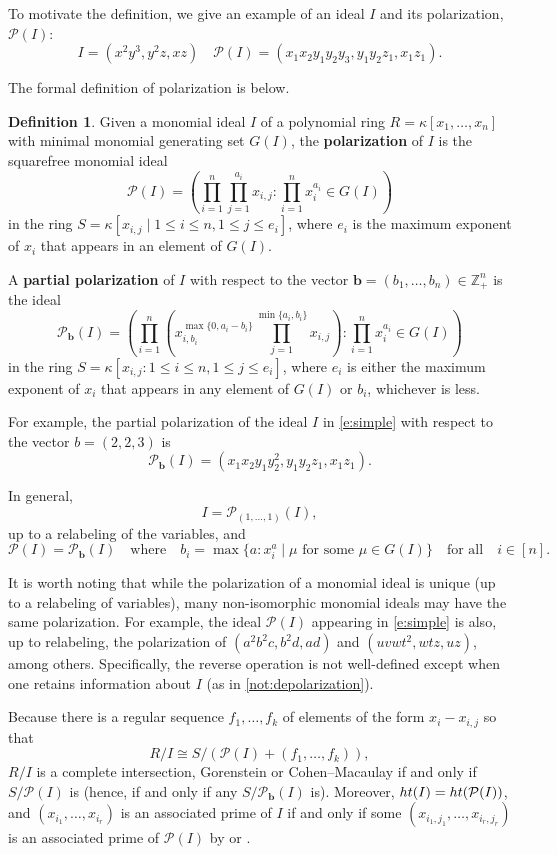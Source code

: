 \documentclass[12pt, reqno]{amsart}
\numberwithin{equation}{section}
\newtheorem{Main Conjecture}[theorem]{Main Conjecture}
\theoremstyle{definition}
\newtheorem{defn}[theorem]{Definition}
\theoremstyle{plain}
\newcommand{\hgt}{{\rm{ht }}}
\newcommand{\ZZ}{\mathbb{Z}}
\renewcommand{\P}{\mathcal{P}}
\newcommand{\bb}{\mathbf{b}}
\newcommand{\qforall}{\quad \mbox{for all} \quad}
\newcommand{\qwhere}{\quad \mbox{where} \quad}
\begin{document}
To motivate the definition, we give an example of an ideal $I$ and its polarization, $\P(I)$: 
\begin{equation}\label{e:simple}
I=(x^2y^3,y^2z,xz) \quad \P(I)=(x_1x_2y_1y_2y_3,y_1y_2z_1,x_1z_1).
\end{equation}

The formal definition of polarization is below.

 \begin{defn}
 \label{def:polarization}
 Given a monomial ideal $I$ of a polynomial ring $R=\kappa[x_1,\ldots, x_n]$ with minimal monomial generating set $G(I)$,
 the {\bf polarization} of $I$ is the squarefree monomial ideal  
 \[
 \P(I)=\left (\prod_{i=1}^n\prod_{j=1}^{a_i}x_{i,j} \colon \prod_{i=1}^n x_i^{a_i}\in G(I)\right)
 \]
 in the ring $S=\kappa[x_{i,j}\mid 1\leq i\leq n, 1\leq j\leq e_i]$, where $e_i$ is the maximum exponent of $x_i$ that appears in an element of $G(I)$.  
 
 A {\bf partial polarization} of $I$ with respect to the vector $\bb=(b_1,\ldots,b_n) \in \ZZ_+^n$ is the ideal  
 \[
 \P_{\bb}(I)=\left ( \prod_{i=1}^n\left(x_{i,{b_i}}^{\max\{0,a_i-b_i\}}\prod_{j=1}^{\min\{a_i,b_i\}}x_{i,j} \right) : \prod_{i=1}^n x_i^{a_i}\in G(I)\right)
 \]
 in the ring $S=\kappa[x_{i,j}: 1\leq i\leq n, 1\leq j\leq e_i]$, where $e_i$ is either the maximum exponent of $x_i$ that appears in any element of $G(I)$ or $b_i$, whichever is less.  
\end{defn}

For example, the partial polarization of the ideal $I$ in \cref{e:simple} with respect to the vector $b=(2,2,3)$ is 
$$\P_{\bb}(I)=(x_1x_2y_1y_2^2,y_1y_2z_1,x_1z_1).$$

\noindent In general, $$I=\P_{(1,\ldots, 1)}(I),$$ up to a relabeling of the variables,  and 
$$\P(I)=\P_{\bb}(I) \qwhere b_i = \max \{a \colon x_i^a \mid \mu \mbox{ for some } \mu \in G(I)\} \qforall i \in [n].$$

It is worth noting that while the polarization of a monomial ideal is unique (up to a relabeling of variables), many non-isomorphic monomial ideals may have the same polarization. For example, the ideal $\P(I)$ appearing in \cref{e:simple} is also, up to relabeling,  the polarization of $(a^2b^2c, b^2d, ad)$ and $(uvwt^2,wtz,uz)$, among others. Specifically, the reverse operation  is not well-defined except when one retains information about $I$ (as in  \cref{not:depolarization}).


Because there is a regular sequence $f_1, \ldots, f_k$ of elements of the form $x_i-x_{i,j}$ so that $$R/I \cong S/(\P(I)+(f_1, \ldots, f_k)),$$ $R/I$ is a complete intersection, Gorenstein or Cohen--Macaulay if and only if $S/\P(I)$ is \cite{Fr} (hence, if and only if any $S/\P_{\bb}(I)$ is).  Moreover, $\hgt(I) = \hgt(\P(I))$, and $(x_{i_1}, \ldots, x_{i_r})$ is an associated prime of $I$ if and only if some $(x_{i_1,j_1}, \ldots, x_{i_r,j_r})$ is an associated prime of $\P(I)$ by \cite[Proposition 4.4]{Har66} or \cite[Proposition 2.3]{Far06}.
\end{document}
